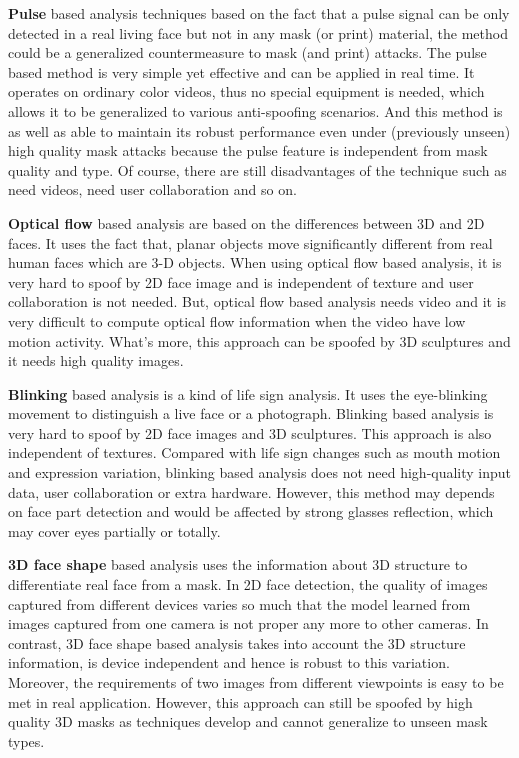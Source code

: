 \documentclass[journal]{IEEEtran}
\begin{document}
\textbf{Pulse} based analysis techniques based on the fact that a pulse signal can be only detected in a real living face but not in any mask (or print) material, the method could be a generalized countermeasure to mask (and print) attacks. The pulse based method is very simple yet effective and can be applied in real time. It operates on ordinary color videos, thus no special equipment is needed, which allows it to be generalized to various anti-spoofing scenarios. And this method is as well as able to maintain its robust performance even under (previously unseen) high quality mask attacks because the pulse feature is independent from mask quality and type. Of course, there are still disadvantages of the technique such as need videos, need user collaboration and so on.

\textbf{Optical flow} based analysis are based on the differences between 3D and 2D faces. It uses the fact that, planar objects move significantly different from real human faces which are 3-D objects. When using optical flow based analysis, it is very hard to spoof by 2D face image and is independent of texture and user collaboration is not needed. But, optical flow based analysis needs video and it is very difficult to compute optical flow information when the video have low motion activity. What’s more, this approach can be spoofed by 3D sculptures and it needs high quality images.

\textbf{Blinking} based analysis is a kind of life sign analysis. It uses the eye-blinking movement to distinguish a live face or a photograph. Blinking based analysis is very hard to spoof by 2D face images and 3D sculptures. This approach is also independent of textures. Compared with life sign changes such as mouth motion and expression variation, blinking based analysis does not need high-quality input data, user collaboration or extra hardware. However, this method may depends on face part detection and would be affected by strong glasses reflection, which may cover eyes partially or totally.

\textbf{3D face shape} based analysis uses the information about 3D structure to differentiate real face from a mask. In 2D face detection, the quality of images captured from different devices varies so much that the model learned from images captured from one camera is not proper any more to other cameras. In contrast, 3D face shape based analysis takes into account the 3D structure information, is device independent and hence is robust to this variation. Moreover, the requirements of two images from different viewpoints is easy to be met in real application. However, this approach can still be spoofed by high quality 3D masks as techniques develop and cannot generalize to unseen mask types.
\end{document}
